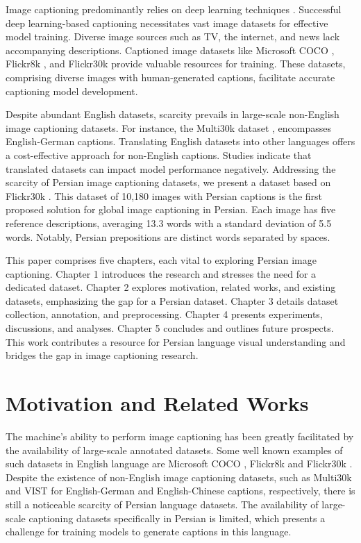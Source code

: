\documentclass[lettersize,journal]{IEEEtran}
\begin{document}
Image captioning predominantly relies on deep learning techniques \cite{Karpathy2015,Vinyals2015,Xu2015,Luo2023}. Successful deep learning-based captioning necessitates vast image datasets for effective model training. Diverse image sources such as TV, the internet, and news lack accompanying descriptions. Captioned image datasets like Microsoft COCO \cite{MSCOCO}, Flickr8k \cite{Flickr8k}, and Flickr30k \cite{Flickr30k} provide valuable resources for training. These datasets, comprising diverse images with human-generated captions, facilitate accurate captioning model development.

Despite abundant English datasets, scarcity prevails in large-scale non-English image captioning datasets. For instance, the Multi30k dataset \cite{Multi30k}, encompasses English-German captions. Translating English datasets into other languages offers a cost-effective approach for non-English captions. Studies \cite{Xue,Zoph,Rosa} indicate that translated datasets can impact model performance negatively. Addressing the scarcity of Persian image captioning datasets, we present a dataset based on Flickr30k \cite{Flickr30k}. This dataset of 10,180 images with Persian captions is the first proposed solution for global image captioning in Persian. Each image has five reference descriptions, averaging 13.3 words with a standard deviation of 5.5 words. Notably, Persian prepositions are distinct words separated by spaces.

This paper comprises five chapters, each vital to exploring Persian image captioning. Chapter 1 introduces the research and stresses the need for a dedicated dataset. Chapter 2 explores motivation, related works, and existing datasets, emphasizing the gap for a Persian dataset. Chapter 3 details dataset collection, annotation, and preprocessing. Chapter 4 presents experiments, discussions, and analyses. Chapter 5 concludes and outlines future prospects. This work contributes a resource for Persian language visual understanding and bridges the gap in image captioning research.

\section{Motivation and Related Works}
The machine's ability to perform image captioning has been greatly facilitated by the availability of large-scale annotated datasets. Some well known examples of such datasets in English language are Microsoft COCO \cite{MSCOCO}, Flickr8k \cite{Flickr8k} and Flickr30k \cite{Flickr30k}. Despite the existence of non-English image captioning datasets, such as Multi30k \cite{Multi30k} and VIST \cite{VIST} for English-German and English-Chinese captions, respectively, there is still a noticeable scarcity of Persian language datasets. The availability of large-scale captioning datasets specifically in Persian is limited, which presents a challenge for training models to generate captions in this language.
\end{document}
